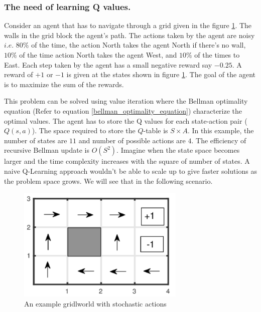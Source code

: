 \documentclass[12pt]{report}
\newcommand{\ie}{\textit{i.e.}}
\begin{document}
\subsubsection{The need of learning Q values.}
Consider an agent that has to navigate through a grid given in the figure \ref{fig:gridworld_ex}. The walls in the grid block the agent's path. The actions taken by the agent are noisy $\ie$  $80\%$ of the time, the action North takes the agent North if there's no wall, $10\%$ of the time action North takes the agent West, and $10\%$ of the times to East. Each step taken by the agent has a small negative reward say $-0.25$. A reward of $+1$ or $-1$ is given at the states shown in figure \ref{fig:gridworld_ex}. The goal of the agent is to maximize the sum of the rewards. \par 
This problem can be solved using value iteration where the Bellman optimality equation (Refer to equation \ref{bellman_optimality_equation}) characterize the optimal values. The agent has to store the Q values for each state-action pair ($Q(s,a)$). The space required to store the $Q$-table is $S \times A$. In this example, the number of states are $11$ and number of possible actions are $4$. The efficiency of recursive Bellman update is $O(S^2)$. Imagine when the state space becomes larger and the time complexity increases with the square of number of states. A naive Q-Learning approach wouldn't be able to scale up to give faster solutions as the problem space grows. We will see that in the following scenario.

\begin{figure}[htp]
	\centering
	\includegraphics[width=8cm]{gridworld.pdf}
	\caption{An example gridlworld with stochastic actions}
   \label{fig:gridworld_ex}
\end{figure}
\end{document}
